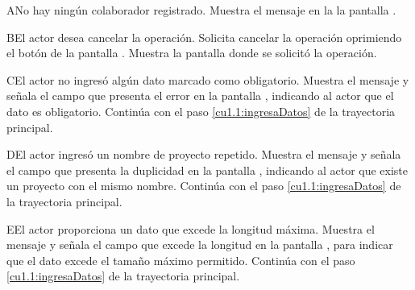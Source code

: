  \begin{UCtrayectoriaA}{A}{No hay ningún colaborador registrado.}
    \UCpaso[\UCsist] Muestra el mensaje  en la la pantalla .
 \end{UCtrayectoriaA} 
 \begin{UCtrayectoriaA}{B}{El actor desea cancelar la operación.}
    \UCpaso[\UCactor] Solicita cancelar la operación oprimiendo el botón  de la pantalla .
    \UCpaso[\UCsist] Muestra la pantalla donde se solicitó la operación.
 \end{UCtrayectoriaA} 
 \begin{UCtrayectoriaA}{C}{El actor no ingresó algún dato marcado como obligatorio.}
    \UCpaso[\UCsist] Muestra el mensaje  y señala el campo que presenta el error en la pantalla 
	    , indicando al actor que el dato es obligatorio.
    \UCpaso[] Continúa con el paso \ref{cu1.1:ingresaDatos} de la trayectoria principal.
 \end{UCtrayectoriaA}
 \begin{UCtrayectoriaA}{D}{El actor ingresó un nombre de proyecto repetido.}
    \UCpaso[\UCsist] Muestra el mensaje  y señala el campo que presenta la duplicidad en la pantalla 
	    , indicando al actor que existe un proyecto con el mismo nombre.
    \UCpaso[] Continúa con el paso \ref{cu1.1:ingresaDatos} de la trayectoria principal.
 \end{UCtrayectoriaA}
 
 \begin{UCtrayectoriaA}{E}{El actor proporciona un dato que excede la longitud máxima.}
    \UCpaso[\UCsist] Muestra el mensaje  y señala el campo que excede la 
    longitud en la pantalla , para indicar que el dato excede el tamaño máximo permitido.
    \UCpaso[] Continúa con el paso \ref{cu1.1:ingresaDatos} de la trayectoria principal.
 \end{UCtrayectoriaA}
 
